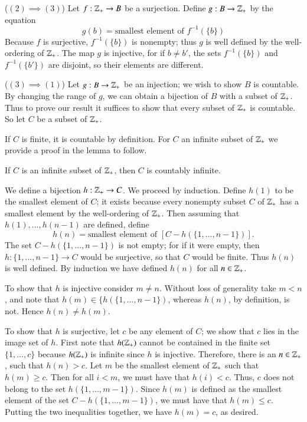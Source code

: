 \documentclass[12pt, a4paper, twoside, openright, titlepage]{book}
\begin{document}
\begin{appendices}
\begin{proof*}{}{}
        ($(2)\implies (3)$) Let $f:\mathbb Z_+\rightarrow B$ be a surjection. Define $g:B\rightarrow \mathbb Z_+$ by the equation \begin{equation*}
            g(b) = \text{smallest element of $f^{-1}(\{b\})$}
        \end{equation*}
        Because $f$ is surjective, $f^{-1}(\{b\})$ is nonempty; thus $g$ is well defined by the well-ordering of $\mathbb Z_+$. The map $g$ is injective, for if $b \neq b'$, the sets $f^{-1}(\{b\})$ and $f^{-1}(\{b'\})$ are disjoint, so their elements are different.

        ($(3)\implies (1)$) Let $g:B\rightarrow \mathbb Z_+$ be an injection; we wish to show $B$ is countable. By changing the range of $g$, we can obtain a bijection of $B$ with a subset of $\mathbb Z_+$. Thus to prove our result it suffices to show that every subset of $\mathbb Z_+$ is countable. So let $C$ be a subset of $\mathbb Z_+$.

        If $C$ is finite, it is countable by definition. For $C$ an infinite subset of $\mathbb Z_+$ we provide a proof in the lemma to follow.
    \end{proof*}


    \begin{lem}{}{}
        If $C$ is an infinite subset of $\mathbb Z_+$, then $C$ is countably infinite.
    \end{lem}
    \begin{proof*}{}{}
        We define a bijection $h:\mathbb Z_+\rightarrow C$. We proceed by induction. Define $h(1)$ to be the smallest element of $C$; it exists because every nonempty subset $C$ of $\mathbb Z_+$ has a smallest element by the well-ordering of $\mathbb Z_+$. Then assuming that $h(1),...,h(n-1)$ are defined, define \begin{equation*}
            h(n) = \text{smallest element of } [C-h(\{1,...,n-1\})].
        \end{equation*}
        The set $C-h(\{1,...,n-1\})$ is not empty; for if it were empty, then $h:\{1,...,n-1\}\rightarrow C$ would be surjective, so that $C$ would be finite. Thus $h(n)$ is well defined. By induction we have defined $h(n)$ for all $n \in \mathbb Z_+$.


        To show that $h$ is injective consider $m \neq n$. Without loss of generality take $m < n$, and note that $h(m) \in \{h(\{1,...,n-1\})$, whereas $h(n)$, by definition, is not. Hence $h(n) \neq h(m)$.

        To show that $h$ is surjective, let $c$ be any element of $C$; we show that $c$ lies in the image set of $h$. First note that $h(\mathbb Z_+)$ cannot be contained in the finite set $\{1,...,c\}$ because $h(\mathbb Z_+)$ is infinite since $h$ is injective. Therefore, there is an $n \in \mathbb Z_+$, such that $h(n) > c$. Let $m$ be the smallest element of $\mathbb Z_+$ such that $h(m) \geq c$. Then for all $i < m$, we must have that $h(i) < c$. Thus, $c$ does not belong to the set $h(\{1,...,m-1\})$. Since $h(m)$ is defined as the smallest element of the set $C-h(\{1,...,m-1\})$, we must have that $h(m) \leq c$. Putting the two inequalities together, we have $h(m) = c$, as desired.
    \end{proof*}



\end{appendices}
\end{document}
